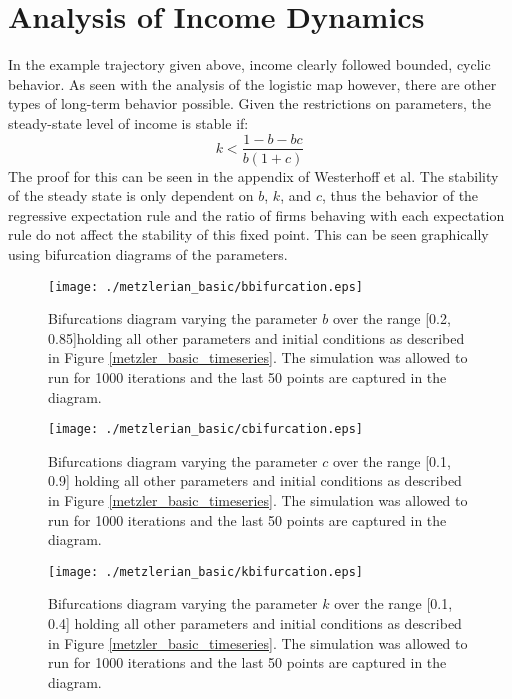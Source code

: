 \section{Analysis of Income Dynamics}
In the example trajectory given above, income clearly followed bounded, cyclic behavior. As seen with the analysis of the logistic map however, there are other types of long-term behavior possible. Given the restrictions on parameters, the steady-state level of income is stable if:
\begin{equation}
    k<\frac{1-b-bc}{b(1+c)}
\end{equation}
The proof for this can be seen in the appendix of Westerhoff et al.\autocite{Wegener2009} The stability of the steady state is only dependent on $b$, $k$, and $c$, thus the behavior of the regressive expectation rule and the ratio of firms behaving with each expectation rule do not affect the stability of this fixed point. This can be seen graphically using bifurcation diagrams of the parameters.

\begin{figure}
    \centering
    \texttt{[image: ./metzlerian\_basic/bbifurcation.eps]}
    \caption{Bifurcations diagram varying the parameter $b$ over the range [0.2, 0.85]holding all other parameters and initial conditions as described in Figure \ref{metzler_basic_timeseries}. The simulation was allowed to run for 1000 iterations and the last 50 points are captured in the diagram.}
    \label{metzler_basic_bbifurcation}
\end{figure} 

\begin{figure}
    \centering
    \texttt{[image: ./metzlerian\_basic/cbifurcation.eps]}
    \caption{Bifurcations diagram varying the parameter $c$ over the range [0.1, 0.9] holding all other parameters and initial conditions as described in Figure \ref{metzler_basic_timeseries}. The simulation was allowed to run for 1000 iterations and the last 50 points are captured in the diagram.}
    \label{metzler_basic_cbifurcation}
\end{figure} 

\begin{figure}
    \centering
    \texttt{[image: ./metzlerian\_basic/kbifurcation.eps]}
    \caption{Bifurcations diagram varying the parameter $k$ over the range [0.1, 0.4] holding all other parameters and initial conditions as described in Figure \ref{metzler_basic_timeseries}. The simulation was allowed to run for 1000 iterations and the last 50 points are captured in the diagram.}
    \label{metzler_basic_kbifurcation}
\end{figure} 

